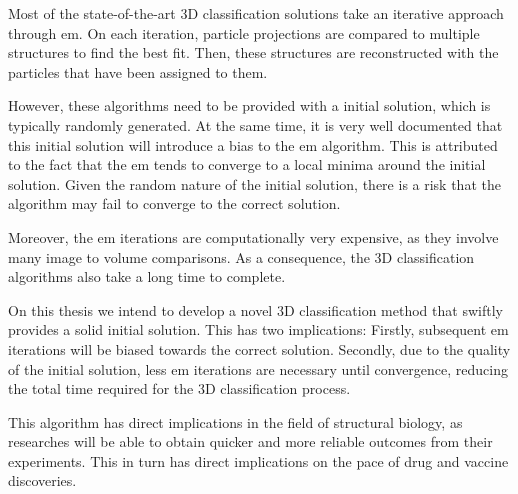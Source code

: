 \documentclass[../main.tex]{subfiles}
\begin{document}
Most of the state-of-the-art 3D classification solutions take an iterative approach through \gls{em}. On each iteration, particle projections are compared to multiple structures to find the best fit. Then, these structures are reconstructed with the particles that have been assigned to them. 

However, these algorithms need to be provided with a initial solution, which is typically randomly generated. At the same time, it is very well documented that this initial solution will introduce a bias to the \gls{em} algorithm\cite{sorzano2022}\cite{jonic2016}. This is attributed to the fact that the \gls{em} tends to converge to a local minima around the initial solution\cite{kennedy2008}. Given the random nature of the initial solution, there is a risk that the algorithm may fail to converge to the correct solution.

Moreover, the \gls{em} iterations are computationally very expensive, as they involve many image to volume comparisons. As a consequence, the 3D classification algorithms also take a long time to complete.  

On this thesis we intend to develop a novel 3D classification method that swiftly provides a solid initial solution. This has two implications: Firstly, subsequent \gls{em} iterations will be biased towards the correct solution. Secondly, due to the quality of the initial solution, less \gls{em} iterations are necessary until convergence, reducing the total time required for the 3D classification process.

This algorithm has direct implications in the field of structural biology, as researches will be able to obtain quicker and more reliable outcomes from their experiments. This in turn has direct implications on the pace of drug and vaccine discoveries.
\end{document}
